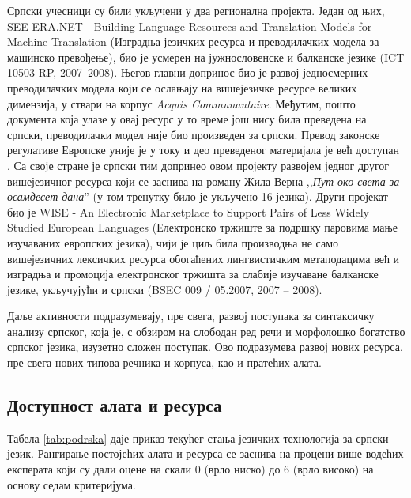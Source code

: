 {\begin{multicols}{2}
Српски учесници су били укључени у два регионална пројекта. Један од њих, SEE-ERA.NET - Building Language Resources and Translation Models for Machine Translation (Изградња језичких ресурса и преводилачких модела за машинско превођење), био је усмерен на јужнословенске и балканске језике (ICT 10503 RP, 2007--2008). Његов главни допринос био је развој једносмерних преводилачких модела који се ослањају на вишејезичке ресурсе великих димензија, у ствари на корпус \textit{Acquis Communautaire}.  Међутим, пошто документа која улазе у овај ресурс у то време још нису била преведена на српски, преводилачки модел није био произведен за српски. Превод законске регулативе Европске уније је у току и део преведеног материјала је већ доступан \cite{PREVODJENJE}. Са своје стране је српски тим допринео овом пројекту развојем једног другог вишејезичног ресурса који се заснива на роману Жила Верна ,,\textit{Пут око света за осамдесет дана}'' (у том тренутку било је укључено 16 језика). Други пројекат био је WISE - An Electronic Marketplace to Support Pairs of Less Widely Studied European Languages (Електронско тржиште за подршку паровима мање изучаваних европских језика), чији је циљ била производња не само вишејезичних лексичких ресурса обогаћених лингвистичким метаподацима већ и изградња и промоција електронског тржишта за слабије изучаване балканске језике, укључујући и српски (BSEC 009 / 05.2007, 2007 -- 2008).

Даље активности подразумевају, пре свега, развој поступака за синтаксичку анализу српског, која је, с обзиром на слободан ред речи и морфолошко богатство српског језика, изузетно сложен поступак. Ово подразумева развој нових ресурса, пре свега нових типова речника и корпуса, као и пратећих алата.
 
 \subsection {Доступност алата и ресурса}
   
Табела \ref{tab:podrska} даје приказ текућег стања језичких технологија за српски језик. Рангирање постојећих алата и ресурса се заснива на процени више водећих експерата који су дали оцене на скали 0 (врло ниско) до 6 (врло високо) на основу седам критеријума. 



\begin{table}[ht]
\centering


\end{table}
\end{multicols}}
